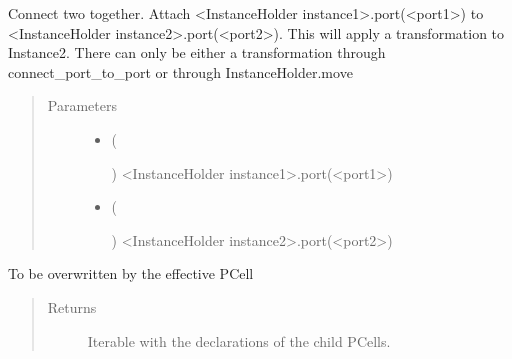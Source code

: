 \documentclass[a4paper,10pt,english]{sphinxmanual}
\begin{document}
\begin{fulllineitems}
\begin{fulllineitems}
Connect two  together. Attach \textless{}InstanceHolder instance1\textgreater{}.port(\textless{}port1\textgreater{}) to \textless{}InstanceHolder instance2\textgreater{}.port(\textless{}port2\textgreater{}).
This will apply a transformation to Instance2. There can only be either a transformation through connect\_port\_to\_port or through InstanceHolder.move
\begin{quote}\begin{description}
\item[{Parameters}] \leavevmode\begin{itemize}
\item {} 
 (%
\begin{footnote}[56]\sphinxAtStartFootnote
{}
%
\end{footnote}) \textendash{} \textless{}InstanceHolder instance1\textgreater{}.port(\textless{}port1\textgreater{})

\item {} 
 (%
\begin{footnote}[57]\sphinxAtStartFootnote
{}
%
\end{footnote}) \textendash{} \textless{}InstanceHolder instance2\textgreater{}.port(\textless{}port2\textgreater{})

\end{itemize}

\end{description}\end{quote}

\end{fulllineitems}


\begin{fulllineitems}
\label{\detokenize{photonics/photonics:kppc.photonics.PhotDevice.create_param_inst}}
To be overwritten by the effective PCell
\begin{quote}\begin{description}
\item[{Returns}] \leavevmode
Iterable with the declarations of the child PCells.


\end{description}
\end{quote}
\end{fulllineitems}
\end{fulllineitems}
\end{document}
